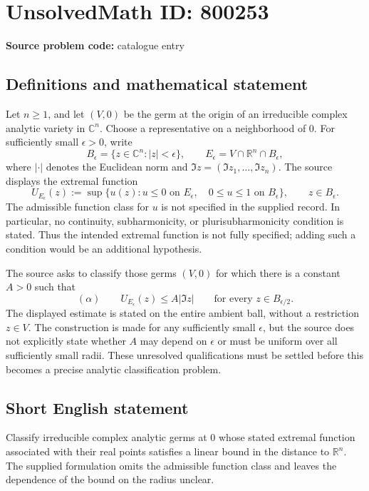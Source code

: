 \documentclass[11pt]{article}
\newcommand{\R}{\mathbb{R}}
\newcommand{\C}{\mathbb{C}}
\begin{document}
\section*{UnsolvedMath ID: 800253}
\textbf{Source problem code:} catalogue entry
\subsection{Definitions and mathematical statement}
Let \(n\geq 1\), and let \((V,0)\) be the germ at the origin of an irreducible complex analytic variety in \(\C^n\). Choose a representative on a neighborhood of \(0\). For sufficiently small \(\epsilon>0\), write
\[
B_\epsilon=\{z\in\C^n:|z|<\epsilon\},\qquad E_\epsilon=V\cap\R^n\cap B_\epsilon,
\]
where \(|\cdot|\) denotes the Euclidean norm and \(\Im z=(\Im z_1,\ldots,\Im z_n)\). The source displays the extremal function
\[
U_{E_\epsilon}(z):=\sup\bigl\{u(z):u\leq0\text{ on }E_\epsilon,\quad 0\leq u\leq1\text{ on }B_\epsilon\bigr\},\qquad z\in B_\epsilon.
\]
The admissible function class for \(u\) is not specified in the supplied record. In particular, no continuity, subharmonicity, or plurisubharmonicity condition is stated. Thus the intended extremal function is not fully specified; adding such a condition would be an additional hypothesis.

The source asks to classify those germs \((V,0)\) for which there is a constant \(A>0\) such that
\[
(\alpha)\qquad U_{E_\epsilon}(z)\leq A|\Im z|\qquad\text{for every }z\in B_{\epsilon/2}.
\]
The displayed estimate is stated on the entire ambient ball, without a restriction \(z\in V\). The construction is made for any sufficiently small \(\epsilon\), but the source does not explicitly state whether \(A\) may depend on \(\epsilon\) or must be uniform over all sufficiently small radii. These unresolved qualifications must be settled before this becomes a precise analytic classification problem.
\subsection{Short English statement}
Classify irreducible complex analytic germs at \(0\) whose stated extremal function associated with their real points satisfies a linear bound in the distance to \(\R^n\). The supplied formulation omits the admissible function class and leaves the dependence of the bound on the radius unclear.
\end{document}
